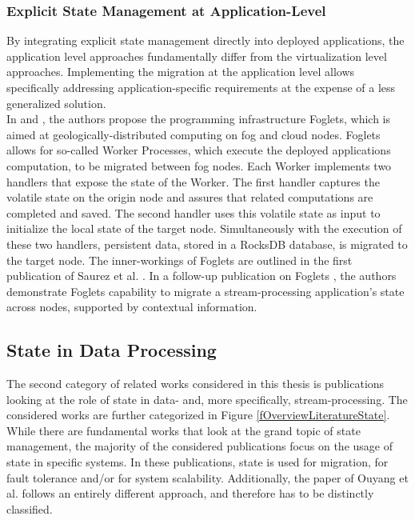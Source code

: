 \subsubsection{Explicit State Management at Application-Level}
\label{lMigrationApplicationLevel}
By integrating explicit state management directly into deployed applications, the application level approaches fundamentally differ from the virtualization level approaches. Implementing the migration at the application level allows specifically addressing application-specific requirements at the expense of a less generalized solution.\\
In \cite{Saurez.2016} and \cite{Saurez.2017}, the authors propose the programming infrastructure Foglets, which is aimed at geologically-distributed computing on fog and cloud nodes. Foglets allows for so-called Worker Processes, which execute the deployed applications computation, to be migrated between fog nodes. Each Worker implements two handlers that expose the state of the Worker. The first handler captures the volatile state on the origin node and assures that related computations are completed and saved. The second handler uses this volatile state as input to initialize the local state of the target node. Simultaneously with the execution of these two handlers, persistent data, stored in a RocksDB database, is migrated to the target node. The inner-workings of Foglets are outlined in the first publication of Saurez et al. \cite{Saurez.2016}. In a follow-up publication on Foglets \cite{Saurez.2017}, the authors demonstrate Foglets capability to migrate a stream-processing application's state across nodes, supported by contextual information.

\subsection{State in Data Processing}
\label{lStateDataProcessing}
The second category of related works considered in this thesis is publications looking at the role of state in data- and, more specifically, stream-processing. The considered works are further categorized in Figure \ref{fOverviewLiteratureState}. While there are fundamental works that look at the grand topic of state management, the majority of the considered publications focus on the usage of state in specific systems. In these publications, state is used for migration, for fault tolerance and/or for system scalability. Additionally, the paper of Ouyang et al. \cite{Ouyang.2011} follows an entirely different approach, and therefore has to be distinctly classified.\par


